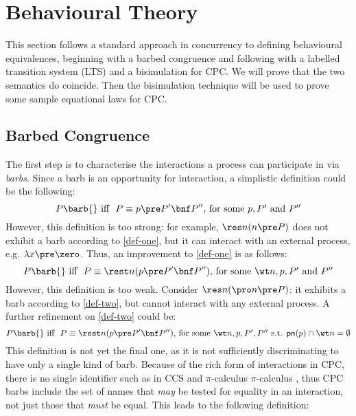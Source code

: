\documentclass{LMCS}
\begin{document}
\section{Behavioural Theory}
\label{sec:bisim}
\newcommand{\usedby}[1]{}


This section follows a standard approach in concurrency to defining
behavioural equivalences, beginning with a barbed congruence and
following with a labelled transition system (LTS) and a bisimulation
for CPC. We will prove that the two semantics do coincide. Then the
bisimulation technique will be used to prove some sample equational
laws for CPC.
\nobreak
\subsection{Barbed Congruence}
The first  step is to characterise the interactions a process can participate in via
{\em barbs}. 
Since a barb is an opportunity for interaction, a simplistic
definition could be the following:
\begin{equation}
\label{def-one}
P \barb{} \mbox{ iff }\ P \equiv p \pre P'\bnf P'' \mbox{, for some $p,P'$ and $P''$}
\end{equation}
However, this definition is too strong: for example, $\res n(n \pre P)$ does not
exhibit a barb according to \eqref{def-one}, but it can interact with an external
process, e.g. $\lambda x \pre \zero$.
Thus, an improvement to \eqref{def-one} is as follows:
\begin{equation}
\label{def-two}
P \barb{} \mbox{ iff }\ P \equiv \rest n(p \pre P'\bnf P'') \mbox{, for some $\wt n, p, P'$ and $P''$}
\end{equation}
However, this definition is too weak. Consider $\res n(\pro n \pre P)$: it exhibits
a barb according to \eqref{def-two}, but cannot interact with any external
process.
A further refinement on \eqref{def-two} could be:
\begin{equation}
\label{def-three}
P \barb{} \mbox{ iff }\ P \equiv \rest n(p \pre P'\bnf P'') \mbox{, for some $\wt n, p, P',P''$ s.t. }
{\sf pn}(p) \cap \wt n = \emptyset
\end{equation}
This definition is not yet the final one, as it is not sufficiently discriminating to have
only a single kind of barb.
Because of the rich form of interactions in CPC, there is no single identifier such as in CCS
and $\pi$-calculus $\pi$-calculus \cite{milner.sangiorgi:barbed-bisimulation},
thus CPC barbs include the set of names that {\em may} be tested for equality
in an interaction, not just those that {\em must} be equal. This leads to the following definition:
\end{document}
